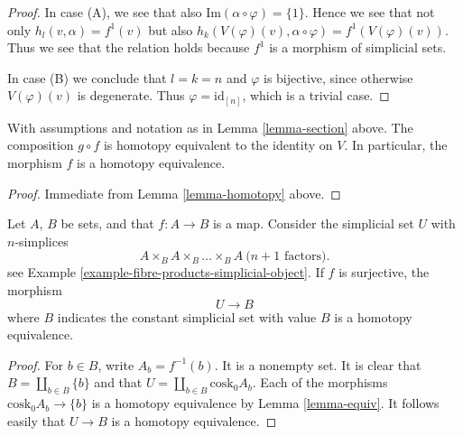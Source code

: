 \begin{proof}
\medskip\noindent
In case (A), we see that also $\text{Im}(\alpha \circ \varphi) = \{1\}$.
Hence we see that not only $h_l(v, \alpha) = f^1(v)$ but also
$h_k(V(\varphi)(v), \alpha \circ \varphi) = f^1(V(\varphi)(v))$.
Thus we see that the relation holds because $f^1$ is a morphism
of simplicial sets.

\medskip\noindent
In case (B) we conclude that $l = k = n$ and
$\varphi$ is bijective, since otherwise $V(\varphi)(v)$
is degenerate. Thus $\varphi = \text{id}_{[n]}$, which is a trivial case.
\end{proof}

\begin{lemma}
\label{lemma-equiv}
With assumptions and notation as in Lemma \ref{lemma-section}
above. The composition $g \circ f$ is homotopy equivalent
to the identity on $V$. In particular, the morphism $f$
is a homotopy equivalence.
\end{lemma}

\begin{proof}
Immediate from Lemma \ref{lemma-homotopy} above.
\end{proof}

\begin{lemma}
\label{lemma-cosk-minus-one-equivalence}
Let $A$, $B$ be sets, and that $f : A \to B$
is a map. Consider the simplicial set $U$ with
$n$-simplices
$$
A \times_B A \times_B \ldots \times_B A\ (n + 1 \text{ factors)}.
$$
see Example \ref{example-fibre-products-simplicial-object}.
If $f$ is surjective, the morphism
$$
U \to B
$$
where $B$ indicates the constant simplicial set with value $B$
is a homotopy equivalence.
\end{lemma}

\begin{proof}
For $b \in B$, write $A_b = f^{-1}(b)$. It is a nonempty set.
It is clear that
$B = \coprod_{b \in B} \{b \}$ and that
$U = \coprod_{b \in B} \text{cosk}_0 A_b$.
Each of the morphisms $\text{cosk}_0 A_b \to \{b\}$
is a homotopy equivalence by Lemma \ref{lemma-equiv}.
It follows easily that $U \to B$ is a homotopy equivalence.
\end{proof}





























